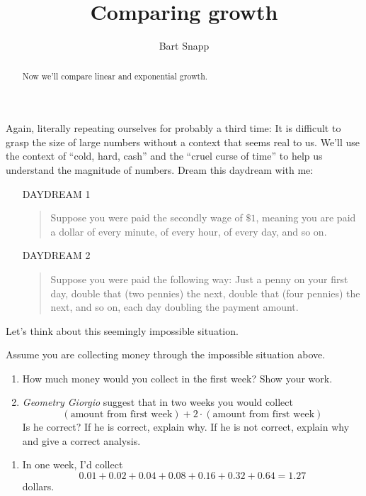 \documentclass[nooutcomes,noauthor,hints]{ximera}
\title{Comparing growth}
\author{Bart Snapp}
\begin{document}
\begin{abstract}
  Now we'll compare linear and exponential growth.
\end{abstract}
\maketitle

\begin{listOutcomes}
\item 
\end{listOutcomes}


Again, literally repeating ourselves for probably a third time: It is
difficult to grasp the size of large numbers without a context that
seems real to us. We'll use the context of ``cold, hard, cash'' and
the ``cruel curse of time'' to help us understand the magnitude of
numbers.  Dream this daydream with me:
\begin{enumerate}
\item[DAYDREAM 1]
\begin{quote}
   Suppose you were paid the secondly wage of $\$1$, meaning you are
  paid a dollar  of every minute, of every hour, of
  every day, and so on.
\end{quote}
\item[DAYDREAM 2]
  \begin{quote}
     Suppose you were paid the following way: Just a penny on your first
  day, double that (two pennies) the next, double that (four pennies)
  the next, and so on, each day doubling the payment amount.
  \end{quote}
\end{enumerate}




Let's think about this seemingly impossible situation.



\mynewpage


\begin{question}
  Assume you are collecting money through the impossible situation
  above.
  \begin{enumerate}
  \item How much money would you collect in the first week? Show your
    work.
  \item \textit{Geometry Giorgio} suggest that in two weeks you would
    collect
    \[
    (\text{amount from first week}) + 2\cdot (\text{amount from first
      week})
    \]
    Is he correct? If he is correct, explain why. If he is not
    correct, explain why and give a correct analysis.
  \end{enumerate}
  \begin{freeResponse}
    \begin{enumerate}
    \item In one week, I'd collect
      \[
      0.01+0.02+0.04+0.08+0.16+0.32+0.64 = 1.27
      \]
      dollars.
    \end{enumerate}
  \end{freeResponse}
\end{question}
\mynewpage
\end{document}
